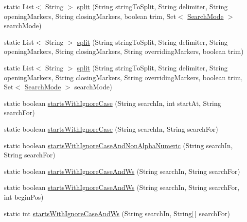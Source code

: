 \begin{DoxyCompactItemize}
\item 
static List$<$ String $>$ \mbox{\hyperlink{classcom_1_1mysql_1_1cj_1_1util_1_1_string_utils_affdf59620285d1e99161cb7f09f934b1}{split}} (String string\+To\+Split, String delimiter, String opening\+Markers, String closing\+Markers, boolean trim, Set$<$ \mbox{\hyperlink{enumcom_1_1mysql_1_1cj_1_1util_1_1_string_utils_1_1_search_mode}{Search\+Mode}} $>$ search\+Mode)
\item 
static List$<$ String $>$ \mbox{\hyperlink{classcom_1_1mysql_1_1cj_1_1util_1_1_string_utils_a02cfd394f6f8bd6ec2a5e4e8541ae2bc}{split}} (String string\+To\+Split, String delimiter, String opening\+Markers, String closing\+Markers, String overriding\+Markers, boolean trim)
\item 
static List$<$ String $>$ \mbox{\hyperlink{classcom_1_1mysql_1_1cj_1_1util_1_1_string_utils_a6f82f2224187e8d46fd9dedf5da1965f}{split}} (String string\+To\+Split, String delimiter, String opening\+Markers, String closing\+Markers, String overriding\+Markers, boolean trim, Set$<$ \mbox{\hyperlink{enumcom_1_1mysql_1_1cj_1_1util_1_1_string_utils_1_1_search_mode}{Search\+Mode}} $>$ search\+Mode)
\item 
static boolean \mbox{\hyperlink{classcom_1_1mysql_1_1cj_1_1util_1_1_string_utils_a4698191aed0b4000670f7315e3c3b2e2}{starts\+With\+Ignore\+Case}} (String search\+In, int start\+At, String search\+For)
\item 
static boolean \mbox{\hyperlink{classcom_1_1mysql_1_1cj_1_1util_1_1_string_utils_a41a050a870f5bed35d40f2a5d57ccae2}{starts\+With\+Ignore\+Case}} (String search\+In, String search\+For)
\item 
static boolean \mbox{\hyperlink{classcom_1_1mysql_1_1cj_1_1util_1_1_string_utils_a0d5a764ceb465c096e7b2b24d444e773}{starts\+With\+Ignore\+Case\+And\+Non\+Alpha\+Numeric}} (String search\+In, String search\+For)
\item 
static boolean \mbox{\hyperlink{classcom_1_1mysql_1_1cj_1_1util_1_1_string_utils_a2298af2ffee1efab8d573b5c22402008}{starts\+With\+Ignore\+Case\+And\+Ws}} (String search\+In, String search\+For)
\item 
static boolean \mbox{\hyperlink{classcom_1_1mysql_1_1cj_1_1util_1_1_string_utils_a9e333e061facfdfad33dd7d86aba5c58}{starts\+With\+Ignore\+Case\+And\+Ws}} (String search\+In, String search\+For, int begin\+Pos)
\item 
static int \mbox{\hyperlink{classcom_1_1mysql_1_1cj_1_1util_1_1_string_utils_aae0e1f4ae3e82601eec8db89d23634ef}{starts\+With\+Ignore\+Case\+And\+Ws}} (String search\+In, String\mbox{[}$\,$\mbox{]} search\+For)

\end{DoxyCompactItemize}
